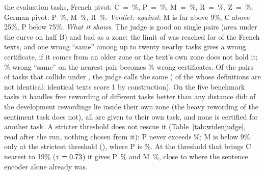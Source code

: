the evaluation tasks, French pivot: \textsf{C}~=~\WidenJudgeC{}\%, \textsf{P}~=~\WidenJudgeFrP{}\%, \textsf{M}~=~\WidenJudgeFrM{}\%,
\textsf{R}~=~\WidenJudgeFrR{}\%, \textsf{Z}~=~\WidenJudgeFrZ{}\%; German pivot: \textsf{P}~\WidenJudgeDeP{}\%, \textsf{M}~\WidenJudgeDeM{}\%, \textsf{R}~\WidenJudgeDeR{}\%.
\emph{Verdict: against}: \textsf{M} is far above 9\%, \textsf{C} above 25\%, \textsf{P} below 75\%. \emph{What it shows.} The judge is good on single pairs
(area under the curve \WidenJudgeAucNli{} on half B) and bad as a zone: the limit of \WidenJudgeLimit{} was reached for
\WidenJudgeLimitFr{} of the \WidenTasksEval{} French texts, and one wrong ``same'' among up to twenty nearby tasks gives a wrong
certificate, if it comes from an older zone or the text's own zone does not hold it; \WidenJudgeNegSame{}\% wrong ``same'' on the nearest pair becomes \WidenJudgeFrM{}\% wrong certificates. Of the
\WidenJudgeCollisionPairs{} pairs of tasks that collide under \cert{}, the judge calls \WidenJudgeCollisionSame{} the same (\WidenJudgeCollisionNotSameSame{} of the \WidenJudgeCollisionNotSame{} whose definitions are not identical; identical texts score 1 by construction).
On the five benchmark tasks it handles free rewording of different tasks better than any distance did:
\WidenJudgeBenchInside{} of the \WidenJudgeBenchTotal{} development rewordings lie inside their own zone (the heavy
rewording of the sentiment task does not), all are given to their own task, and none is certified for another task.
A stricter threshold does not rescue it (Table~\ref{tab:widenjudge}, read after the run, nothing chosen from it): \textsf{P} never exceeds
\WidenSweepPMax{}\%; \textsf{M} is below 9\% only at the strictest threshold (\WidenSweepLastTau{}), where \textsf{P} is \WidenSweepLastP{}\%. At
the threshold that brings \textsf{C} nearest to 19\% ($\tau = 0.73{}$) it gives \textsf{P}~\WidenSweepMidP{}\% and \textsf{M}~\WidenSweepMidM{}\%,
close to where the sentence encoder alone already was.

\begin{table}[t]
  \caption{The judge zone over twelve thresholds $\tau$ (French pivot, \WidenTasksEval{} evaluation
  tasks, in \%), looked at after the run; no value was chosen from it. The primary $\tau = \WidenJudgeTau{}$ was fixed on half B
  before the run (the row 0.19 is a grid point, not the primary $\tau$).}
  \label{tab:widenjudge}
  \centering
  \small
  
\end{table}

